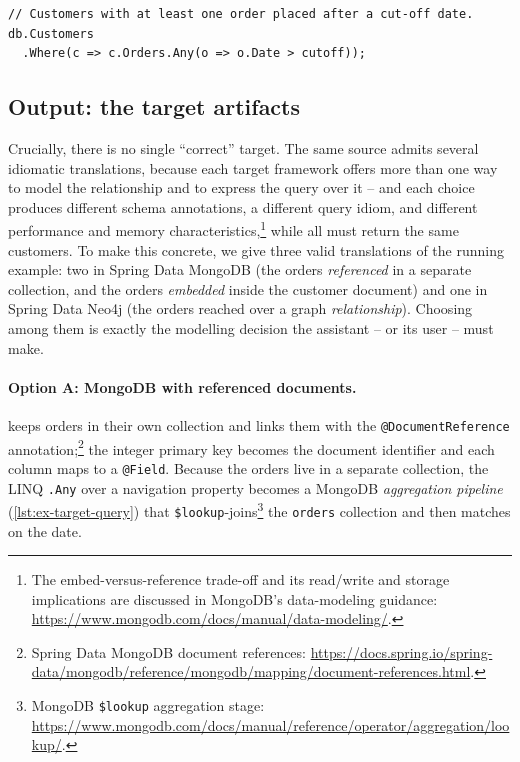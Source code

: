 \begin{listing}[H]
\begin{verbatim}
// Customers with at least one order placed after a cut-off date.
db.Customers
  .Where(c => c.Orders.Any(o => o.Date > cutoff));
\end{verbatim}
\caption{Source query -- a LINQ expression over the entity of \cref{lst:ex-source-schema}.}
\label{lst:ex-source-query}
\end{listing}

\subsection{Output: the target artifacts}

Crucially, there is no single ``correct'' target. The same source admits several idiomatic translations, because each target framework offers more than one way to model the relationship and to express the query over it -- and each choice produces different schema annotations, a different query idiom, and different performance and memory characteristics,\footnote{The embed-versus-reference trade-off and its read/write and storage implications are discussed in MongoDB's data-modeling guidance: \url{https://www.mongodb.com/docs/manual/data-modeling/}.} while all must return the same customers. To make this concrete, we give three valid translations of the running example: two in Spring Data MongoDB (the orders \emph{referenced} in a separate collection, and the orders \emph{embedded} inside the customer document) and one in Spring Data Neo4j (the orders reached over a graph \emph{relationship}). Choosing among them is exactly the modelling decision the assistant -- or its user -- must make.

\paragraph{Option A: MongoDB with referenced documents.}
 keeps orders in their own collection and links them with the \texttt{@DocumentReference} annotation;\footnote{Spring Data MongoDB document references: \url{https://docs.spring.io/spring-data/mongodb/reference/mongodb/mapping/document-references.html}.} the integer primary key becomes the document identifier and each column maps to a \texttt{@Field}. Because the orders live in a separate collection, the LINQ \texttt{.Any} over a navigation property becomes a MongoDB \emph{aggregation pipeline} (\cref{lst:ex-target-query}) that \texttt{\$lookup}-joins\footnote{MongoDB \texttt{\$lookup} aggregation stage: \url{https://www.mongodb.com/docs/manual/reference/operator/aggregation/lookup/}.} the \texttt{orders} collection and then matches on the date.


